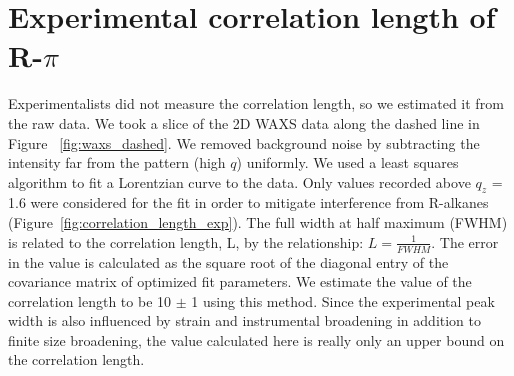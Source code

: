 \documentclass[journal=jpcbfk,manusciprt=article]{achemso}
\begin{document}
  \section{Experimental correlation length of R-$\pi$}\label{section:correlation_length}
 
  \vspace{1em}
  Experimentalists did not measure the correlation length, so we estimated it
  from the raw data. We took a slice of the 2D WAXS data along the dashed line in
  Figure ~\ref{fig:waxs_dashed}. We removed background noise by subtracting the
  intensity far from the pattern (high $q$) uniformly. We used a least squares
  algorithm to fit a Lorentzian curve to the data. Only values recorded above
  $q_z$ = 1.6 were considered for the fit in order to mitigate interference from
  R-alkanes (Figure~\ref{fig:correlation_length_exp}). The full width at half
  maximum (FWHM) is related to the correlation length, L, by the relationship: $
  L = \frac{1}{FWHM} $. The error in the value is calculated as the square root
  of the diagonal entry of the covariance matrix of optimized fit parameters.
  We estimate the value of the correlation length to be 10 $\pm$ 1 using this 
  method. Since the experimental peak width is also influenced by strain and 
  instrumental broadening in addition to finite size broadening, the value 
  calculated here is really only an upper bound on the correlation length. 
\end{document}
